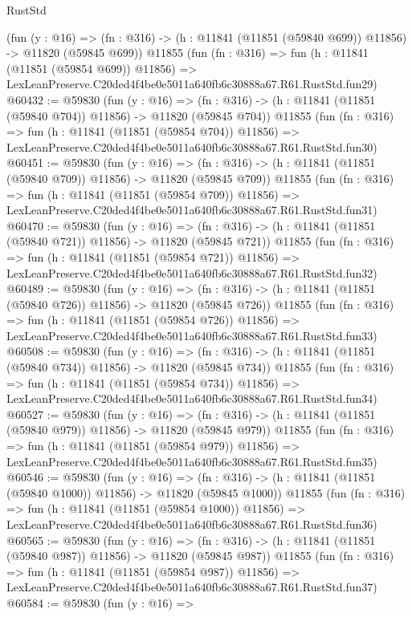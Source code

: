\begin{lexlean}{RustStd}
\begin{coremodule}
    (fun (y : @16) =>
    (fn : @316) -> (h : @11841 (@11851 (@59840 @699)) @11856) -> @11820 (@59845 @699))
    @11855
    (fun (fn : @316) =>
    fun (h : @11841 (@11851 (@59854 @699)) @11856) =>
    LexLeanPreserve.C20ded4f4be0e5011a640fb6c30888a67.R61.RustStd.fun29)
@60432 := @59830
    (fun (y : @16) =>
    (fn : @316) -> (h : @11841 (@11851 (@59840 @704)) @11856) -> @11820 (@59845 @704))
    @11855
    (fun (fn : @316) =>
    fun (h : @11841 (@11851 (@59854 @704)) @11856) =>
    LexLeanPreserve.C20ded4f4be0e5011a640fb6c30888a67.R61.RustStd.fun30)
@60451 := @59830
    (fun (y : @16) =>
    (fn : @316) -> (h : @11841 (@11851 (@59840 @709)) @11856) -> @11820 (@59845 @709))
    @11855
    (fun (fn : @316) =>
    fun (h : @11841 (@11851 (@59854 @709)) @11856) =>
    LexLeanPreserve.C20ded4f4be0e5011a640fb6c30888a67.R61.RustStd.fun31)
@60470 := @59830
    (fun (y : @16) =>
    (fn : @316) -> (h : @11841 (@11851 (@59840 @721)) @11856) -> @11820 (@59845 @721))
    @11855
    (fun (fn : @316) =>
    fun (h : @11841 (@11851 (@59854 @721)) @11856) =>
    LexLeanPreserve.C20ded4f4be0e5011a640fb6c30888a67.R61.RustStd.fun32)
@60489 := @59830
    (fun (y : @16) =>
    (fn : @316) -> (h : @11841 (@11851 (@59840 @726)) @11856) -> @11820 (@59845 @726))
    @11855
    (fun (fn : @316) =>
    fun (h : @11841 (@11851 (@59854 @726)) @11856) =>
    LexLeanPreserve.C20ded4f4be0e5011a640fb6c30888a67.R61.RustStd.fun33)
@60508 := @59830
    (fun (y : @16) =>
    (fn : @316) -> (h : @11841 (@11851 (@59840 @734)) @11856) -> @11820 (@59845 @734))
    @11855
    (fun (fn : @316) =>
    fun (h : @11841 (@11851 (@59854 @734)) @11856) =>
    LexLeanPreserve.C20ded4f4be0e5011a640fb6c30888a67.R61.RustStd.fun34)
@60527 := @59830
    (fun (y : @16) =>
    (fn : @316) -> (h : @11841 (@11851 (@59840 @979)) @11856) -> @11820 (@59845 @979))
    @11855
    (fun (fn : @316) =>
    fun (h : @11841 (@11851 (@59854 @979)) @11856) =>
    LexLeanPreserve.C20ded4f4be0e5011a640fb6c30888a67.R61.RustStd.fun35)
@60546 := @59830
    (fun (y : @16) =>
    (fn : @316) -> (h : @11841 (@11851 (@59840 @1000)) @11856) -> @11820 (@59845 @1000))
    @11855
    (fun (fn : @316) =>
    fun (h : @11841 (@11851 (@59854 @1000)) @11856) =>
    LexLeanPreserve.C20ded4f4be0e5011a640fb6c30888a67.R61.RustStd.fun36)
@60565 := @59830
    (fun (y : @16) =>
    (fn : @316) -> (h : @11841 (@11851 (@59840 @987)) @11856) -> @11820 (@59845 @987))
    @11855
    (fun (fn : @316) =>
    fun (h : @11841 (@11851 (@59854 @987)) @11856) =>
    LexLeanPreserve.C20ded4f4be0e5011a640fb6c30888a67.R61.RustStd.fun37)
@60584 := @59830
    (fun (y : @16) =>

\end{coremodule}
\end{lexlean}
